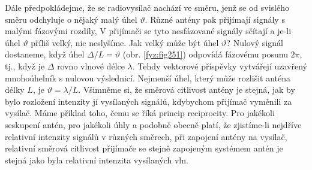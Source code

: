 {    Dále předpokládejme, že se radiovysílač nachází ve směru, jenž se od svislého směru odchyluje o 
    nějaký malý úhel \(\vartheta\). Různé antény pak přijímají signály s malými fázovými rozdíly, V 
    přijímači se tyto nesfázované signály sčítají a je-li úhel \(\vartheta\) příliš velký, nic 
    neslyšíme. Jak velký může být úhel \(\vartheta\)? Nulový signál dostaneme, když úhel \(\Delta/L 
    =\vartheta\) (obr. \ref{fyz:fig251}) odpovídá fázovému posunu \(2\pi\), tj., když je \(\Delta\) 
    rovno vlnové délce \(\lambda\). Tehdy vektorové příspěvky vytvářejí uzavřený mnohoúhelník s 
    nulovou výslednicí. Nejmenší úhel, který může rozlišit anténa délky \(L\), je \(\vartheta = 
    \lambda/L\). Všimněme si, že směrová citlivost antény je stejná, jak by bylo rozložení 
    intenzity jí vysílaných signálů, kdybychom přijímač vyměnili za vysílač. Máme příklad toho, 
    čemu se říká princip reciprocity. Pro jakékoli seskupení antén, pro jakékoli úhly a podobně 
    obecně platí, že zjistíme-li nejdříve relativní intenzity signálů v různých směrech, při 
    zapojení antény na vysílač, relativní směrová citlivost přijímače se stejně zapojeným systémem 
    antén je stejná jako byla relativní intenzita vysílaných vln. 
    
}
